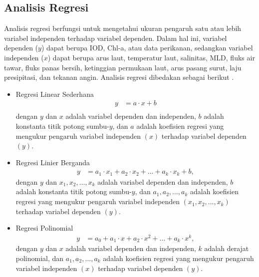 \begin{spacing}{1.5}
		\subsection[Analisis Regresi]{Analisis Regresi}
		Analisis regresi berfungsi untuk mengetahui ukuran pengaruh satu atau lebih variabel independen terhadap variabel dependen. Dalam hal ini, variabel dependen ($y$) dapat berupa IOD, Chl-a, atau data perikanan, sedangkan variabel independen ($x$) dapat berupa arus laut, temperatur laut, salinitas, MLD, fluks air tawar, fluks panas bersih, ketinggian permukaan laut, arus pasang surut, laju presipitasi, dan tekanan angin.  Analisis regresi dibedakan sebagai berikut  \cite{ANGELINI2019722}.
		\begin{itemize}
			\item Regresi Linear Sederhana
			\begin{equation}
				\begin{aligned}
					y &= a \cdot x+b\\
				\end{aligned}
			\end{equation}
			dengan $y$ dan $x$ adalah variabel dependen dan independen, $b$ adalah konstanta titik potong sumbu-$y$, dan $a$ adalah koefisien regresi yang mengukur pengaruh variabel independen $(x)$ terhadap variabel dependen $(y)$.
			\item Regresi Linier Berganda
			\begin{equation}
				\begin{aligned}
					y &= a_1 \cdot x_1+a_2 \cdot x_2+\dots+a_k \cdot x_k+b,
				\end{aligned}
			\end{equation}
			dengan $y$ dan $x_1,x_2,\dots,x_k$ adalah variabel dependen dan independen, $b$ adalah konstanta titik potong sumbu-$y$, dan $a_1,a_2,\dots,a_k$ adalah koefisien regresi yang mengukur pengaruh variabel independen $(x_1,x_2,\dots,x_k)$ terhadap variabel dependen $(y)$.
			\item Regresi Polinomial
			\begin{equation}
				\begin{aligned}
					y &= a_0+a_1 \cdot x+a_2 \cdot x^2+\dots+a_k \cdot x^k,
				\end{aligned}
			\end{equation}
			dengan $y$ dan $x$ adalah variabel dependen dan independen, $k$ adalah derajat polinomial, dan $a_1,a_2,\dots,a_k$ adalah koefisien regresi yang mengukur pengaruh variabel independen $(x)$ terhadap variabel dependen $(y)$.
		\end{itemize}
	

\end{spacing}
